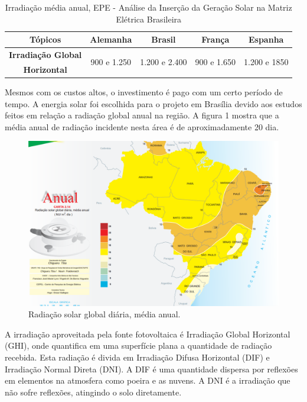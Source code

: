 \begin{table}[H]
\centering
\begin{tabular}{|c|c|c|c|c|}
\hline 
\textbf{Tópicos} & \textbf{Alemanha} & \textbf{Brasil} & \textbf{França} & \textbf{Espanha}\tabularnewline
\hline
\hline 
\textbf{Irradiação Global} & \multirow{2}{*}{900 e 1.250} & \multirow{2}{*}{1.200 e 2.400} & \multirow{2}{*}{900 e 1.650} & \multirow{2}{*}{1.200 e 1850}\tabularnewline
\textbf{Horizontal\nicefrac{\nicefrac{\si{\kilo\watt\hour}}{\si{\meter}$^2$}}{ano}} &  &  &  & \tabularnewline
\hline 
\end{tabular}
\caption{Irradiação média anual, EPE - Análise da Inserção da Geração Solar na Matriz Elétrica Brasileira}
\label{irradiacao_media_anual}
\end{table}

Mesmos com os custos altos, o investimento é pago com um certo período de tempo. A energia solar foi escolhida para o projeto em Brasília devido aos estudos feitos em relação a radiação global anual na região. A figura 1 mostra que a média anual de radiação incidente nesta área é de aproximadamente 20 dia.

\begin{figure}[H]
\centering
\includegraphics[width=.7\linewidth,keepaspectratio,angle=0]{figuras/radiacao_solar.eps}
\caption{Radiação solar global diária, média anual.}
\end{figure}

	A irradiação aproveitada pela fonte fotovoltaica é Irradiação Global Horizontal (GHI), onde quantifica em uma superfície plana a quantidade de radiação recebida. Esta radiação é divida em Irradiação Difusa Horizontal (DIF) e Irradiação Normal Direta (DNI). A DIF é uma quantidade dispersa por reflexões em elementos na atmosfera como poeira e as nuvens. A DNI é a irradiação que não sofre reflexões, atingindo o solo diretamente\cite{2012Energetica}.

